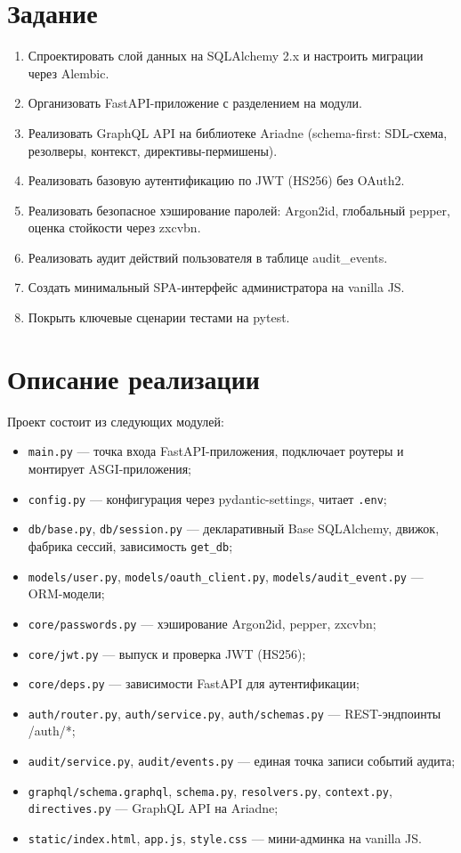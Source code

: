 \documentclass[oneside,a4paper,14pt]{extarticle}
\begin{document}
\section*{Задание}
\begin{enumerate}
    \item Спроектировать слой данных на SQLAlchemy 2.x и настроить миграции через Alembic.
    \item Организовать FastAPI-приложение с разделением на модули.
    \item Реализовать GraphQL API на библиотеке Ariadne (schema-first: SDL-схема, резолверы, контекст, директивы-пермишены).
    \item Реализовать базовую аутентификацию по JWT (HS256) без OAuth2.
    \item Реализовать безопасное хэширование паролей: Argon2id, глобальный pepper, оценка стойкости через zxcvbn.
    \item Реализовать аудит действий пользователя в таблице audit\_events.
    \item Создать минимальный SPA-интерфейс администратора на vanilla JS.
    \item Покрыть ключевые сценарии тестами на pytest.
\end{enumerate}

\section*{Описание реализации}

Проект состоит из следующих модулей:

\begin{itemize}
    \item \texttt{main.py} — точка входа FastAPI-приложения, подключает роутеры и монтирует ASGI-приложения;
    \item \texttt{config.py} — конфигурация через pydantic-settings, читает \texttt{.env};
    \item \texttt{db/base.py}, \texttt{db/session.py} — декларативный Base SQLAlchemy, движок, фабрика сессий, зависимость \texttt{get\_db};
    \item \texttt{models/user.py}, \texttt{models/oauth\_client.py}, \texttt{models/audit\_event.py} — ORM-модели;
    \item \texttt{core/passwords.py} — хэширование Argon2id, pepper, zxcvbn;
    \item \texttt{core/jwt.py} — выпуск и проверка JWT (HS256);
    \item \texttt{core/deps.py} — зависимости FastAPI для аутентификации;
    \item \texttt{auth/router.py}, \texttt{auth/service.py}, \texttt{auth/schemas.py} — REST-эндпоинты /auth/*;
    \item \texttt{audit/service.py}, \texttt{audit/events.py} — единая точка записи событий аудита;
    \item \texttt{graphql/schema.graphql}, \texttt{schema.py}, \texttt{resolvers.py}, \texttt{context.py}, \texttt{directives.py} — GraphQL API на Ariadne;
    \item \texttt{static/index.html}, \texttt{app.js}, \texttt{style.css} — мини-админка на vanilla JS.
\end{itemize}
\end{document}
